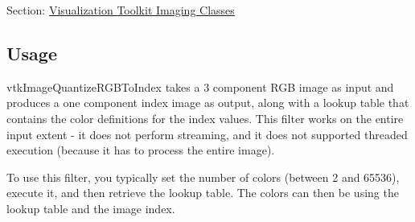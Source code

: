 Section\-: \hyperlink{sec_vtkimaging}{Visualization Toolkit Imaging Classes} \hypertarget{vtkwidgets_vtkxyplotwidget_Usage}{}\subsection{Usage}\label{vtkwidgets_vtkxyplotwidget_Usage}
vtk\-Image\-Quantize\-R\-G\-B\-To\-Index takes a 3 component R\-G\-B image as input and produces a one component index image as output, along with a lookup table that contains the color definitions for the index values. This filter works on the entire input extent -\/ it does not perform streaming, and it does not supported threaded execution (because it has to process the entire image).

To use this filter, you typically set the number of colors (between 2 and 65536), execute it, and then retrieve the lookup table. The colors can then be using the lookup table and the image index.

